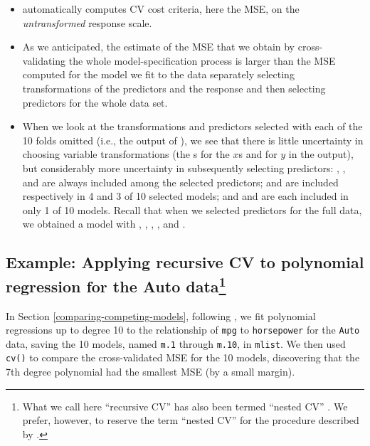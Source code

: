 \documentclass[
]{jss}
\providecommand{\tightlist}{%
  \setlength{\itemsep}{0pt}\setlength{\parskip}{0pt}}
\begin{document}
\begin{itemize}
\tightlist
\item
   automatically computes CV cost criteria,
  here the MSE, on the \emph{untransformed} response scale.
\item
  As we anticipated, the estimate of the MSE that we obtain by
  cross-validating the whole model-specification process is larger than
  the MSE computed for the model we fit to the  data
  separately selecting transformations of the predictors and the
  response and then selecting predictors for the whole data set.
\item
  When we look at the transformations and predictors selected with each
  of the 10 folds omitted (i.e., the output of ),
  we see that there is little uncertainty in choosing variable
  transformations (the s for the \(x\)s and 
  for \(y\) in the output), but considerably more uncertainty in
  subsequently selecting predictors: , ,
  and  are always included among the selected predictors;
   and  are included respectively
  in 4 and 3 of 10 selected models; and  and
   are each included in only 1 of 10 models. Recall that
  when we selected predictors for the full data, we obtained a model
  with , , ,
  , and .
\end{itemize}

\subsection[Example: Applying recursive CV to polynomial regression for
the Auto data]{\texorpdfstring{Example: Applying recursive CV to
polynomial regression for the Auto
data\footnote{What we call here ``recursive CV'' has also been termed
  ``nested CV'' \citep[e.g., in the  package
  by][]{OlsenZachariae:2024}. We prefer, however, to reserve the term
  ``nested CV'' for the procedure described by
  \citep{BatesHastieTibshirani:2023}.}}{Example: Applying recursive CV to polynomial regression for the Auto data}}\label{example-applying-recursive-cv-to-polynomial-regression-for-the-auto-datarecursive-cv}

In Section \ref{comparing-competing-models}, following \citet[Secs. 5.1,
5.3]{JamesEtAl:2021}, we fit polynomial regressions up to degree 10 to
the relationship of \texttt{mpg} to \texttt{horsepower} for the
\texttt{Auto} data, saving the 10 models, named \texttt{m.1} through
\texttt{m.10}, in \texttt{mlist}. We then used \texttt{cv()} to compare
the cross-validated MSE for the 10 models, discovering that the 7th
degree polynomial had the smallest MSE (by a small margin).
\end{document}
